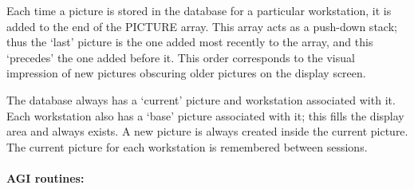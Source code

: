 Each time a picture is stored in the database for a particular workstation,
it is added to the end of the PICTURE array.
This array acts as a push-down stack; thus the `last' picture is the one added
most recently to the array, and this `precedes' the one added before it.
This order corresponds to the visual impression of new pictures obscuring
older pictures on the display screen.

The database always has a `current' picture and workstation associated with it.
Each workstation also has a `base' picture associated with it; this fills the
display area and always exists.
A new picture is always created inside the current picture.
The current picture for each workstation is remembered between sessions.

\paragraph{AGI routines:}\hfill

